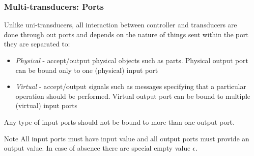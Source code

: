\documentclass{beamer}
\theoremstyle{definition}
\theoremstyle{plain}
\begin{document}
\begin{frame}
\frametitle{Multi-transducers: Ports}
Unlike uni-transducers, all interaction between controller and transducers are done through out ports and depends on the nature of things sent within the port they are separated to:
\begin{itemize}
\item \textit{Physical} - accept/output physical objects such as parts. Physical output port can be bound only
to one (physical) input port
\item \textit{Virtual} - accept/output signals such as messages specifying that a particular operation should be performed. Virtual output port can be bound to multiple (virtual) input ports
\end{itemize}
Any type of input ports should not be bound to more than one output port.
\\
\begin{alertblock}{Note}
All input ports must have input value and all output ports must provide an output value. In case of absence there are special empty value $\epsilon$.
\end{alertblock}
\end{frame}
\end{document}
